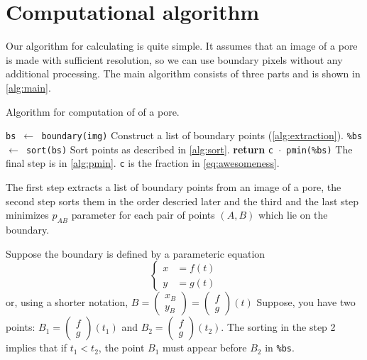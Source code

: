 \documentclass[reprint,amsmath,amssymb,aps,pre,showkeys,showpacs]{revtex4-1}
\newcommand{\highlight}[1]{{\color{red}{#1}}} %
\begin{document}
\section{Computational algorithm}
\label{seq:alg}
Our algorithm for calculating \highlight{awesomeness} is quite simple. It
assumes that an image of a pore is made with sufficient resolution, so we can
use boundary pixels without any additional processing. The main algorithm
consists of three parts and is shown in \cref{alg:main}.
\begin{algorithm}[H]
  \caption{Algorithm for computation of \highlight{awesomeness} of a pore.}
  \label{alg:main}
  \begin{algorithmic}[1]
    \State \texttt{bs $\gets$ boundary(img)}
    \Comment Construct a list of boundary points (\cref{alg:extraction}).
    \State \texttt{\%bs $\gets$ sort(bs)}
    \Comment Sort points as described in \cref{alg:sort}.
    \State \textbf{return} \texttt{c $\cdot$ pmin(\%bs)}
    \Comment The final step is in \cref{alg:pmin}. \texttt{c} is the fraction in
    \cref{eq:awesomeness}.
    \EndProcedure
  \end{algorithmic}
\end{algorithm}

The first step extracts a list of boundary points from an image of a pore, the
second step sorts them in the order descried later and the third and the last
step minimizes $p_{AB}$ parameter for each pair of points $(A, B)$ which lie on
the boundary.

Suppose the boundary is defined by a parameteric equation
\begin{equation*}
  \left\{
  \begin{aligned}
    x &= f(t) \\
    y &= g(t)
  \end{aligned}
  \right.
\end{equation*}
or, using a shorter notation,
$B = \begin{pmatrix} x_B \\ y_B \end{pmatrix} = \begin{pmatrix} f \\ g \end{pmatrix}(t)$
Suppose, you have two points: $B_1 = \begin{pmatrix} f \\ g \end{pmatrix}(t_1)$
and $B_2 = \begin{pmatrix} f \\ g \end{pmatrix}(t_2)$. The sorting in the step 2
implies that if $t_1 < t_2$, the point $B_1$ must appear before $B_2$ in
\texttt{\%bs}.
\end{document}
